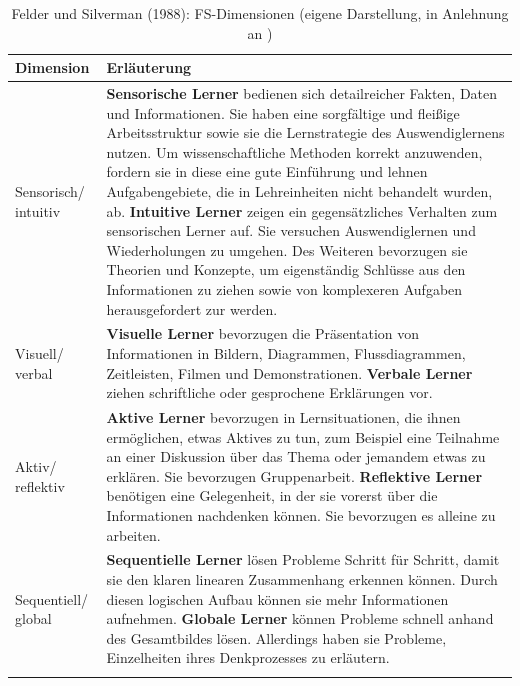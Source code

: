         \begingroup
            \footnotesize    
            \useunder{\uline}{\ul}{}
            \begin{longtable}{|m{3cm}|m{12cm}|}
            \hline     
            \rowcolor[HTML]{EFEFEF}                                         
            \centering \textbf{Dimension} & \centering \arraybackslash \textbf{ Erläuterung} \\ 
            \hline  \hline 
            Sensorisch/ intuitiv &  \textbf{Sensorische Lerner} bedienen sich detailreicher Fakten, Daten und Informationen. Sie haben eine sorgfältige und fleißige Arbeitsstruktur sowie sie die Lernstrategie des Auswendiglernens nutzen. Um wissenschaftliche Methoden korrekt anzuwenden, fordern sie in diese eine gute Einführung und lehnen Aufgabengebiete, die in Lehreinheiten nicht behandelt wurden, ab. \textbf{Intuitive Lerner} zeigen ein gegensätzliches Verhalten zum sensorischen Lerner auf. Sie versuchen 
            Auswendiglernen und Wiederholungen zu umgehen. Des Weiteren bevorzugen sie Theorien und Konzepte, um eigenständig
            Schlüsse aus den Informationen zu ziehen sowie von komplexeren Aufgaben herausgefordert zur werden. 
             \\ \hline \hline
            Visuell/ verbal & \textbf{Visuelle Lerner} bevorzugen die Präsentation von Informationen in Bildern, Diagrammen, Flussdiagrammen, Zeitleisten, Filmen und Demonstrationen. \textbf{Verbale Lerner} ziehen schriftliche oder gesprochene Erklärungen vor. 
            \\ \hline \hline
            Aktiv/ reflektiv &  \textbf{Aktive Lerner} bevorzugen in Lernsituationen, die ihnen ermöglichen, etwas Aktives zu tun, zum Beispiel eine Teilnahme an einer Diskussion über das Thema oder jemandem etwas zu erklären.
            Sie bevorzugen Gruppenarbeit. \textbf{Reflektive Lerner} benötigen eine Gelegenheit, in der sie vorerst über die Informationen nachdenken können. Sie bevorzugen es alleine zu arbeiten.
            \\ \hline \hline
            Sequentiell/ global & \textbf{Sequentielle Lerner} lösen Probleme Schritt für Schritt, damit sie den klaren linearen Zusammenhang erkennen können. Durch diesen logischen Aufbau können sie mehr Informationen aufnehmen. \textbf{Globale Lerner} können Probleme schnell anhand des Gesamtbildes lösen. Allerdings haben sie Probleme, Einzelheiten ihres Denkprozesses zu erläutern.
            \\ \hline \hline
        \caption[Felder und Silverman (1988): FS-Dimensionen]{Felder und Silverman (1988): FS-Dimensionen (eigene Darstellung, in Anlehnung an \parencite[22 ff.]{Felder.1995})} 
        \label{tab:/ILS-Dimensionen} 
        \end{longtable}
        \endgroup  
        
